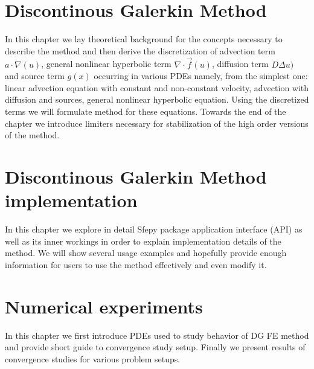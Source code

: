 \documentclass{book}
\theoremstyle{definition}
\numberwithin{equation}{section}
\numberwithin{table}{section}
\begin{document}
\chapter{Discontinous Galerkin Method}
\label{ch:theory}
In this chapter we lay theoretical background for the concepts necessary to describe the 
method and then derive the discretization of advection term $a\cdot\nabla(u)$, general 
nonlinear hyperbolic term $\nabla\cdot \vec{f}(u)$, diffusion term $D \Delta 
u)$ and source term $g(x)$ occurring in various PDEs namely, from the 
simplest one: linear advection equation with constant and non-constant 
velocity, advection with diffusion and sources, general nonlinear hyperbolic 
equation. Using the discretized terms we will formulate method for these 
equations. Towards the end of the chapter we introduce limiters necessary for 
stabilization of the high order versions of the method.




\chapter{Discontinous Galerkin Method implementation}
\label{ch:implementation}
In this chapter we explore in detail Sfepy package application interface (API) 
as well as its inner workings in order to explain implementation details of the 
method. We will show several usage examples and hopefully provide enough 
information for users to use the method effectively and even modify it.




\chapter{Numerical experiments}
\label{ch:convergence}
In this chapter we first introduce PDEs used to study behavior of DG FE method and 
provide short guide to convergence study setup. 
Finally we present results of convergence studies for various problem setups.






\newpage

\newpage

\newpage

\newpage

\end{document}
